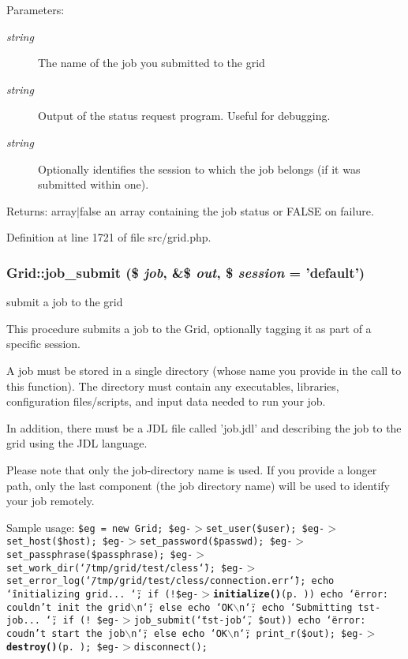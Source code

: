 \begin{Desc}
\item[Parameters:]
\begin{description}
\item[{\em string}]The name of the job you submitted to the grid \item[{\em string}]Output of the status request program. Useful for debugging. \item[{\em string}]Optionally identifies the session to which the job belongs (if it was submitted within one).\end{description}
\end{Desc}
\begin{Desc}
\item[Returns:]array$|$false an array containing the job status or FALSE on failure. \end{Desc}


Definition at line 1721 of file src/grid.php.
\subsubsection{\setlength{\rightskip}{0pt plus 5cm}Grid::job\_\-submit (\$ {\em job}, \&\$ {\em out}, \$ {\em session} = 'default')}\label{classGrid_a47}


submit a job to the grid 

This procedure submits a job to the Grid, optionally tagging it as part of a specific session.

A job must be stored in a single directory (whose name you provide in the call to this function). The directory must contain any executables, libraries, configuration files/scripts, and input data needed to run your job.

In addition, there must be a JDL file called 'job.jdl' and describing the job to the grid using the JDL language.

Please note that only the job-directory name is used. If you provide a longer path, only the last component (the job directory name) will be used to identify your job remotely.

Sample usage: {\tt  \$eg = new Grid; \$eg-$>$set\_\-user(\$user); \$eg-$>$set\_\-host(\$host); \$eg-$>$set\_\-password(\$passwd); \$eg-$>$set\_\-passphrase(\$passphrase); \$eg-$>$set\_\-work\_\-dir(\char`\"{}/tmp/grid/test/cless\char`\"{}); \$eg-$>$set\_\-error\_\-log(\char`\"{}/tmp/grid/test/cless/connection.err\char`\"{}); echo \char`\"{}initializing grid... \char`\"{}; if (!\$eg-$>${\bf initialize()}{\rm (p.\,\pageref{classGrid_a11})}) echo \char`\"{}error: couldn't init the grid$\backslash$n\char`\"{}; else echo \char`\"{}OK$\backslash$n\char`\"{}; echo \char`\"{}Submitting tst-job... \char`\"{}; if (! \$eg-$>$job\_\-submit(\char`\"{}tst-job\char`\"{}, \$out)) echo \char`\"{}error: coudn't start the job$\backslash$n\char`\"{}; else echo \char`\"{}OK$\backslash$n\char`\"{}; print\_\-r(\$out); \$eg-$>${\bf destroy()}{\rm (p.\,\pageref{classGrid_a12})}; \$eg-$>$disconnect(); }

